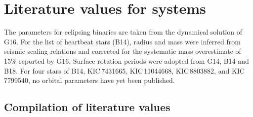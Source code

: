 
\chapter{Literature values for \Kepler systems \label{chap:appendixExtensiveTables}}
\label{sec:appendix}



The parameters for eclipsing binaries are taken from the dynamical solution of G16. For the list of heartbeat stars (B14), radius and mass were inferred from seismic scaling relations and corrected for the systematic mass overestimate of 15\% reported by G16. Surface rotation periods were adopted from G14, B14 and B18. For four stars of B14, KIC\,7431665, KIC\,11044668, KIC\,8803882, and KIC\,7799540,  no orbital parameters have yet been published.



\section{Compilation of literature values}

